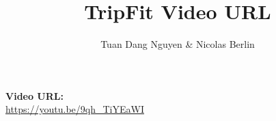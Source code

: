 \documentclass[11pt,a4paper]{article}
\title{TripFit Video URL}
\author{Tuan Dang Nguyen \& Nicolas Berlin}
\date{}
\begin{document}
\maketitle

\textbf{Video URL:}\\
\url{https://youtu.be/9qh_TiYEaWI}
\end{document}
